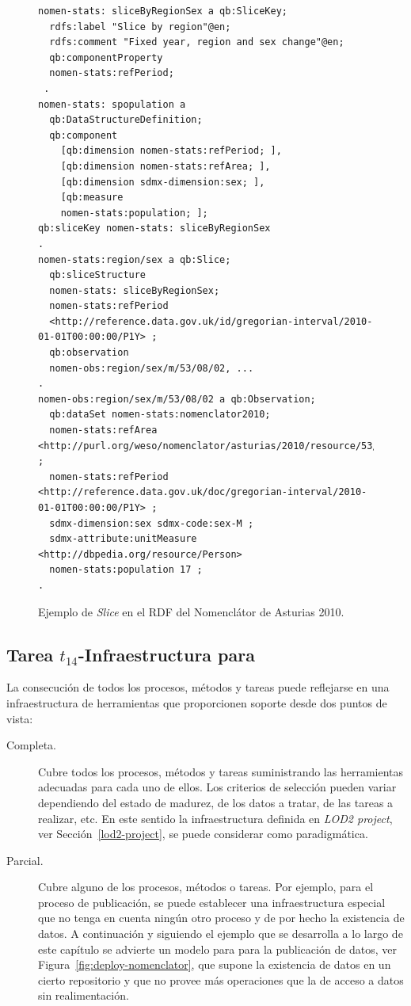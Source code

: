 \begin{figure}[!htp]
\begin{lstlisting}[basicstyle=\scriptsize] 
nomen-stats: sliceByRegionSex a qb:SliceKey;
  rdfs:label "Slice by region"@en;
  rdfs:comment "Fixed year, region and sex change"@en;
  qb:componentProperty
  nomen-stats:refPeriod; 
 .
nomen-stats: spopulation a
  qb:DataStructureDefinition;
  qb:component
    [qb:dimension nomen-stats:refPeriod; ],
    [qb:dimension nomen-stats:refArea; ],
    [qb:dimension sdmx-dimension:sex; ],
    [qb:measure
    nomen-stats:population; ];
qb:sliceKey nomen-stats: sliceByRegionSex
.
nomen-stats:region/sex a qb:Slice;
  qb:sliceStructure
  nomen-stats: sliceByRegionSex;
  nomen-stats:refPeriod
  <http://reference.data.gov.uk/id/gregorian-interval/2010-01-01T00:00:00/P1Y> ;
  qb:observation
  nomen-obs:region/sex/m/53/08/02, ...
.
nomen-obs:region/sex/m/53/08/02 a qb:Observation;
  qb:dataSet nomen-stats:nomenclator2010;
  nomen-stats:refArea <http://purl.org/weso/nomenclator/asturias/2010/resource/53/08/02> ;
  nomen-stats:refPeriod <http://reference.data.gov.uk/doc/gregorian-interval/2010-01-01T00:00:00/P1Y> ;
  sdmx-dimension:sex sdmx-code:sex-M ;
  sdmx-attribute:unitMeasure <http://dbpedia.org/resource/Person>
  nomen-stats:population 17 ; 
.
\end{lstlisting}
	\caption{Ejemplo de \textit{Slice} en el \dataset RDF del Nomenclátor de Asturias 2010.}
	\label{fig:slice-nomen}
\end{figure}

\newpage

\subsection{Tarea $t_{14}$-Infraestructura para \linkeddata}
La consecución de todos los procesos, métodos y tareas puede reflejarse en una infraestructura
de herramientas que proporcionen soporte desde dos puntos de vista:

\begin{description}
 \item [Completa.] Cubre todos los procesos, métodos y tareas suministrando las herramientas
adecuadas para cada uno de ellos. Los criterios de selección pueden variar dependiendo
del estado de madurez, de los datos a tratar, de las tareas a realizar, etc. En este sentido
la infraestructura definida en \textit{LOD2 project}, ver Sección~\ref{lod2-project}, se puede
considerar como paradigmática.
\item [Parcial.] Cubre alguno de los procesos, métodos o tareas. Por ejemplo, para el proceso
de publicación, se puede establecer una infraestructura especial que no tenga en cuenta ningún
otro proceso y de por hecho la existencia de datos. A continuación y siguiendo el ejemplo que se desarrolla a lo largo de este capítulo se advierte 
un modelo para para la publicación de datos, ver Figura~\ref{fig:deploy-nomenclator}, que 
supone la existencia de datos en un cierto repositorio y que no provee más operaciones
que la de acceso a datos sin realimentación.
\end{description}

